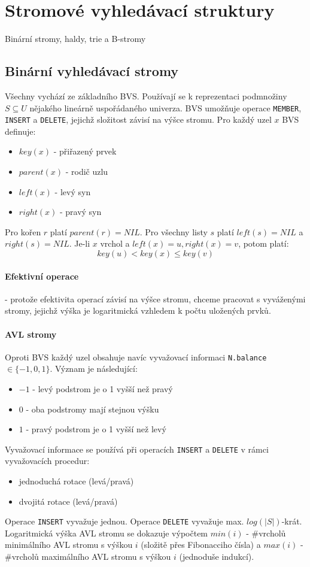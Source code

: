 \documentclass[a4paper]{article}      %
\begin{document}
\section{Stromové vyhledávací struktury}
Binární stromy, haldy, trie a B-stromy

\subsection{Binární vyhledávací stromy}
Všechny vychází ze základního BVS. Používají se k reprezentaci podmnožiny $S \subseteq U$ nějakého lineárně uspořádaného univerza.
BVS umožňuje operace \verb+MEMBER+, \verb+INSERT+ a \verb+DELETE+, jejichž složitost závisí na výšce stromu.
Pro každý uzel $x$ BVS definuje:
\begin{itemize}
\item $key(x)$ - přiřazený prvek
\item $parent(x)$ - rodič uzlu
\item $left(x)$ - levý syn
\item $right(x)$ - pravý syn
\end{itemize}
Pro kořen $r$ platí $parent(r) = NIL$. Pro všechny listy $s$ platí $left(s)=NIL$ a $right(s)=NIL$.
Je-li $x$ vrchol a $left(x) = u, right(x)= v$, potom platí:
\[
key(u) < key(x) \leq key(v)
\]

\paragraph{Efektivní operace} - protože efektivita operací závisí na výšce stromu, chceme pracovat s vyváženými stromy, jejichž výška je logaritmická vzhledem k počtu uložených prvků.

\paragraph{AVL stromy}
Oproti BVS každý uzel obsahuje navíc vyvažovací informaci \verb+N.balance+ $\in \lbrace -1, 0, 1\rbrace$.
Význam je následující:
\begin{itemize}
\item $-1$ - levý podstrom je o 1 vyšší než pravý
\item $0$ - oba podstromy mají stejnou výšku
\item $1$ - pravý podstrom je o 1 vyšší než levý
\end{itemize}
Vyvažovací informace se používá při operacích \verb+INSERT+ a \verb+DELETE+ v rámci vyvažovacích procedur:
\begin{itemize}
\item jednoduchá rotace (levá/pravá)
\item dvojitá rotace (levá/pravá)
\end{itemize}
Operace \verb+INSERT+ vyvažuje jednou. Operace \verb+DELETE+ vyvažuje max. $log(|S|)$-krát. 
Logaritmická výška AVL stromu se dokazuje výpočtem $min(i)$ - \#vrcholů minimálního AVL stromu s výškou $i$ (složitě přes Fibonacciho čísla)
a $max(i)$ - \#vrcholů maximálního AVL stromu s výškou $i$ (jednoduše indukcí).
\end{document}
